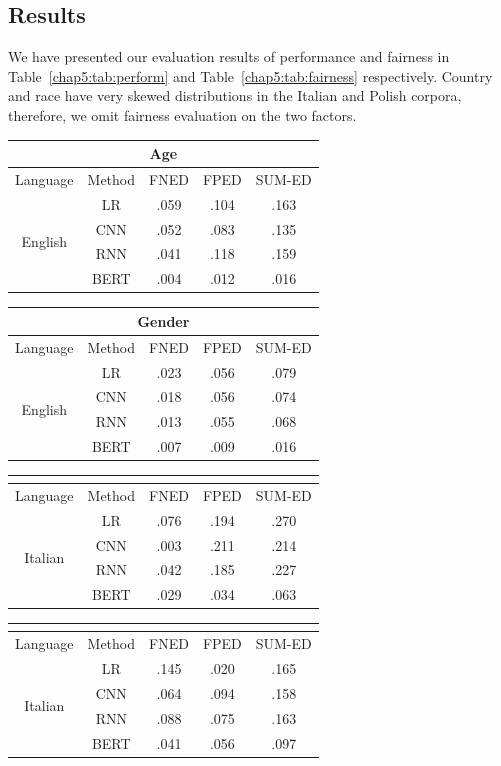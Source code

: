 \subsection{Results}
We have presented our evaluation results of performance and fairness in Table~\ref{chap5:tab:perform} and Table~\ref{chap5:tab:fairness} respectively.
Country and race have very skewed distributions in the Italian and Polish corpora, therefore, we omit fairness evaluation on the two factors.

\begin{table}[htp]
\centering
\footnotesize
\begin{tabular}{cc|ccc}
\multicolumn{5}{c}{\textbf{Age}} \\\hline\hline
Language & Method & FNED & FPED & SUM-ED\\\hline
\multirow{4}{*}{English} & LR & .059 & .104 & .163\\
 & CNN  & .052 & .083 & .135 \\
 & RNN  & .041 & .118 & .159 \\
 & BERT & .004 & .012 & .016 
\end{tabular}
\quad
\begin{tabular}{cc|ccc}
\multicolumn{5}{c}{\textbf{Gender}} \\\hline\hline
Language & Method & FNED & FPED & SUM-ED \\\hline
\multirow{4}{*}{English} & LR & .023 & .056 & .079 \\
 & CNN  & .018 & .056 & .074 \\
 & RNN  & .013 & .055 & .068 \\
 & BERT & .007 & .009 & .016
\end{tabular}

\begin{tabular}{cc|ccc}
\multicolumn{5}{c}{} \\\hline\hline
Language & Method & FNED & FPED & SUM-ED \\\hline
\multirow{4}{*}{Italian} & LR & .076 & .194 & .270\\
 & CNN  & .003 & .211 & .214\\
 & RNN  & .042 & .185 & .227\\
 & BERT & .029 & .034 & .063
\end{tabular}
\quad
\begin{tabular}{cc|ccc}
\multicolumn{5}{c}{} \\\hline\hline
Language & Method & FNED & FPED & SUM-ED \\\hline
\multirow{4}{*}{Italian} & LR  & .145 & .020 & .165 \\
 & CNN  & .064 & .094 & .158 \\
 & RNN  & .088 & .075 & .163 \\
 & BERT & .041 & .056 & .097
\end{tabular}


\end{table}
